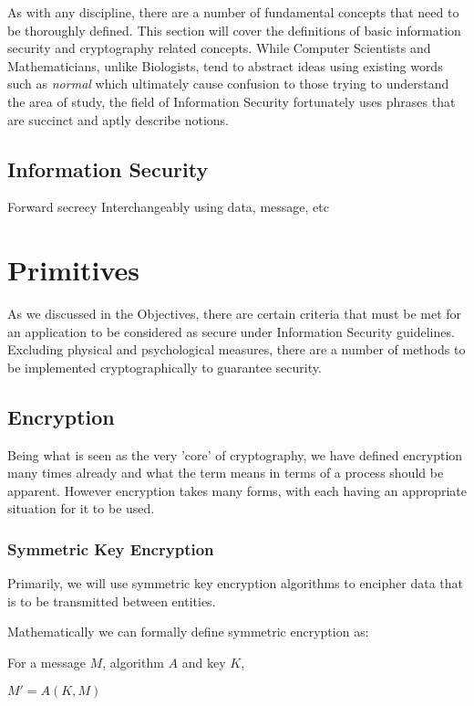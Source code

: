 As with any discipline, there are a number of fundamental concepts that need to be thoroughly defined. This section will cover the definitions of basic information security and cryptography related concepts. While Computer Scientists and Mathematicians, unlike Biologists, tend to abstract ideas using existing words such as \emph{normal} which ultimately cause confusion to those trying to understand the area of study, the field of Information Security fortunately uses phrases that are succinct and aptly describe notions.

\subsection{Information Security}

Forward secrecy
Interchangeably using data, message, etc

\section{Primitives}

As we discussed in the Objectives, there are certain criteria that must be met for an application to be considered as secure under Information Security guidelines. Excluding physical and psychological measures, there are a number of methods to be implemented cryptographically to guarantee security.

\subsection{Encryption}

Being what is seen as the very 'core' of cryptography, we have defined encryption many times already and what the term means in terms of a process should be apparent. However encryption takes many forms, with each having an appropriate situation for it to be used.

\subsubsection{Symmetric Key Encryption}

Primarily, we will use symmetric key encryption algorithms to encipher data that is to be transmitted between entities.

Mathematically we can formally define symmetric encryption as:

For a message $M$, algorithm $A$ and key $K$,

$M'  = A(K,M)$

